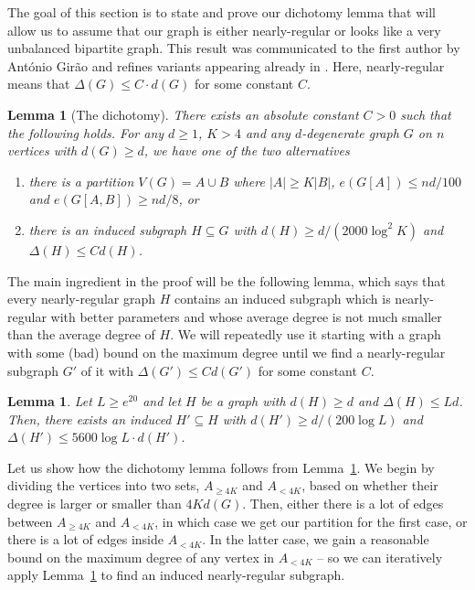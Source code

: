 \documentclass[10pt, a4paper]{article}
\numberwithin{theorem}{section} %
\newtheorem{lemma}[theorem]{Lemma}
\theoremstyle{remark}
\theoremstyle{definition}
\begin{document}
The goal of this section is to state and prove our dichotomy lemma that will allow us to assume that our graph is either nearly-regular or looks like a very unbalanced bipartite graph. This result was communicated to the first author by Ant\'onio Gir\~ao and refines variants appearing already in \cite{GiraoHunter25, BBCD24}. %
Here, nearly-regular means that $\Delta(G) \leq C \cdot d(G)$ for some constant $C$.

\begin{lemma}[The dichotomy]\label{lemma:dichotomy}
    There exists an absolute constant $C > 0$ such that the following holds. For any $d \geq 1$, $K > 4$ and any $d$-degenerate graph $G$ on $n$ vertices with $d(G) \geq d$, we have one of the two alternatives
    \begin{enumerate}
        \item there is a partition $V(G) = A \cup B$ where $|A| \geq K|B|$, $e(G[A]) \leq nd/100$ and $e(G[A, B]) \geq nd/8$, \emph{or}
        \item there is an induced subgraph $H \subseteq G$ with $d(H) \geq d/ \left(2000\log^2 K\right)$ and $\Delta(H) \leq Cd(H)$.
    \end{enumerate}
\end{lemma}

The main ingredient in the proof will be the following lemma, which says that every nearly-regular graph $H$ contains an induced subgraph which is nearly-regular with better parameters and whose average degree is not much smaller than the average degree of $H$. We will repeatedly use it starting with a graph with some (bad) bound on the maximum degree until we find a nearly-regular subgraph $G'$ of it with $\Delta(G') \leq Cd(G')$ for some constant $C$.

\begin{lemma}\label{lemma:getting_more_regular}
Let $L \geq e^{20}$ and let $H$ be a graph with $d(H) \geq d$ and $\Delta(H) \leq Ld$. Then, there exists an induced $H' \subseteq H$ with $d(H') \geq d / \left(200\log L\right)$ and $\Delta(H') \leq 5600\log L \cdot d(H')$.
\end{lemma}

Let us show how the dichotomy lemma follows from Lemma~\ref{lemma:getting_more_regular}. We begin by dividing the vertices into two sets, $A_{\geq 4K}$ and $A_{<4K}$, based on whether their degree is larger or smaller than $4Kd(G)$.
Then, either there is a lot of edges between $A_{\geq 4K}$ and $A_{<4K}$, in which case we get our partition for the first case, or there is a lot of edges inside $A_{<4K}$.
In the latter case, we gain a reasonable bound on the maximum degree of any vertex in $A_{<4K}$ -- so we can iteratively apply Lemma~\ref{lemma:getting_more_regular} to find an induced nearly-regular subgraph.
\end{document}
